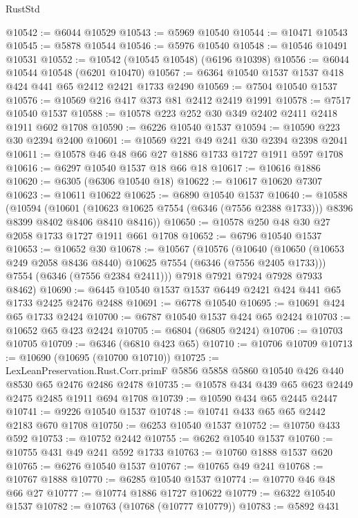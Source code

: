 \begin{lexlean}{RustStd}
\begin{coremodule}
@10542 := @6044 @10529
@10543 := @5969 @10540
@10544 := @10471 @10543
@10545 := @5878 @10544
@10546 := @5976 @10540
@10548 := @10546 @10491 @10531
@10552 := @10542 (@10545 @10548) (@6196 @10398)
@10556 := @6044 @10544 @10548 (@6201 @10470)
@10567 := @6364 @10540 @1537 @1537 @418 @424 @441 @65 @2412 @2421 @1733 @2490
@10569 := @7504 @10540 @1537
@10576 := @10569 @216 @417 @373 @81 @2412 @2419 @1991
@10578 := @7517 @10540 @1537
@10588 := @10578 @223 @252 @30 @349 @2402 @2411 @2418 @1911 @602 @1708
@10590 := @6226 @10540 @1537
@10594 := @10590 @223 @30 @2394 @2400
@10601 := @10569 @221 @49 @241 @30 @2394 @2398 @2041
@10611 := @10578 @46 @48 @66 @27 @1886 @1733 @1727 @1911 @597 @1708
@10616 := @6297 @10540 @1537 @18 @66 @18
@10617 := @10616 @1886
@10620 := @6305 (@6306 @10540 @18)
@10622 := @10617 @10620 @7307
@10623 := @10611 @10622
@10625 := @6890 @10540 @1537
@10640 := @10588
    (@10594
      (@10601
        (@10623 @10625 @7554 (@6346 (@7556 @2388 @1733)))
        @8396
        @8399
        @8402
        @8406
        @8410
        @8416))
@10650 := @10578 @250 @48 @30 @27 @2058 @1733 @1727 @1911 @661 @1708
@10652 := @6796 @10540 @1537
@10653 := @10652 @30
@10678 := @10567
    (@10576
      (@10640
        (@10650 (@10653 @249 @2058 @8436 @8440) @10625 @7554 (@6346 (@7556 @2405 @1733)))
        @7554
        (@6346 (@7556 @2384 @2411)))
      @7918
      @7921
      @7924
      @7928
      @7933
      @8462)
@10690 := @6445 @10540 @1537 @1537 @6449 @2421 @424 @441 @65 @1733 @2425 @2476 @2488
@10691 := @6778 @10540
@10695 := @10691 @424 @65 @1733 @2424
@10700 := @6787 @10540 @1537 @424 @65 @2424
@10703 := @10652 @65 @423 @2424
@10705 := @6804 (@6805 @2424)
@10706 := @10703 @10705
@10709 := @6346 (@6810 @423 @65)
@10710 := @10706 @10709
@10713 := @10690 (@10695 (@10700 @10710))
@10725 := LexLeanPreservation.Rust.Corr.primF
    @5856
    @5858
    @5860
    @10540
    @426
    @440
    @8530
    @65
    @2476
    @2486
    @2478
@10735 := @10578 @434 @439 @65 @623 @2449 @2475 @2485 @1911 @694 @1708
@10739 := @10590 @434 @65 @2445 @2447
@10741 := @9226 @10540 @1537
@10748 := @10741 @433 @65 @65 @2442 @2183 @670 @1708
@10750 := @6253 @10540 @1537
@10752 := @10750 @433 @592
@10753 := @10752 @2442
@10755 := @6262 @10540 @1537
@10760 := @10755 @431 @49 @241 @592 @1733
@10763 := @10760 @1888 @1537 @620
@10765 := @6276 @10540 @1537
@10767 := @10765 @49 @241
@10768 := @10767 @1888
@10770 := @6285 @10540 @1537
@10774 := @10770 @46 @48 @66 @27
@10777 := @10774 @1886 @1727 @10622
@10779 := @6322 @10540 @1537
@10782 := @10763 (@10768 (@10777 @10779))
@10783 := @5892 @431

\end{coremodule}
\end{lexlean}
